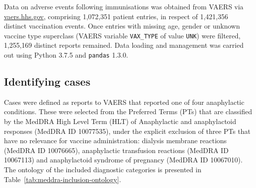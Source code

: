 \documentclass{article}
\begin{document}
Data on adverse events following immunisations was obtained from VAERS via \url{vaers.hhs.gov}, comprising 1,072,351 patient entries, in respect of 1,421,356 distinct vaccination events.
Once entries with missing age, gender or unknown vaccine type superclass (VAERS variable \texttt{VAX\_TYPE} of value \texttt{UNK}) were filtered, 1,255,169 distinct reports remained.
Data loading and management was carried out using Python 3.7.5 and \texttt{pandas} 1.3.0.\cite{mckinney2011pandas}

\subsection{Identifying cases}\label{subsec:identifying-cases}

Cases were defined as reports to VAERS that reported one of four anaphylactic conditions.
These were selected from the Preferred Terms (PTs) that are classified by the MedDRA High Level Term (HLT) of Anaphylactic and anaphylactoid responses (MedDRA ID 10077535), under the explicit exclusion of three PTs that have no relevance for vaccine administration: dialysis membrane reactions (MedDRA ID 10076665), anaphylactic transfusion reactions (MedDRA ID 10067113) and anaphylactoid syndrome of pregnancy (MedDRA ID 10067010).
The ontology of the included diagnostic categories is presented in Table~\ref{tab:meddra-inclusion-ontology}.
\end{document}
